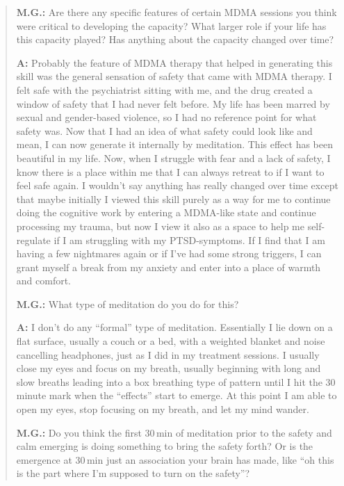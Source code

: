 \documentclass[11pt,oneside]{book}
\begin{document}
\begin{quotation}
    \vspace{\baselineskip}

    \textbf{M.G.:} Are there any specific features of certain MDMA sessions you think were critical to developing the capacity? What larger role if your life has this capacity played? Has anything about the capacity changed over time?

    \textbf{A:} Probably the feature of MDMA therapy that helped in generating this skill was the general sensation of safety that came with MDMA therapy. I felt safe with the psychiatrist sitting with me, and the drug created a window of safety that I had never felt before. My life has been marred by sexual and gender-based violence, so I had no reference point for what safety was. Now that I had an idea of what safety could look like and mean, I can now generate it internally by meditation. This effect has been beautiful in my life. Now, when I struggle with fear and a lack of safety, I know there is a place within me that I can always retreat to if I want to feel safe again. I wouldn't say anything has really changed over time except that maybe initially I viewed this skill purely as a way for me to continue doing the cognitive work by entering a MDMA-like state and continue processing my trauma, but now I view it also as a space to help me self-regulate if I am struggling with my PTSD-symptoms. If I find that I am having a few nightmares again or if I've had some strong triggers, I can grant myself a break from my anxiety and enter into a place of warmth and comfort.

    \vspace{\baselineskip}

    \textbf{M.G.:} What type of meditation do you do for this?

    \textbf{A:} I don't do any \enquote{formal} type of meditation. Essentially I lie down on a flat surface, usually a couch or a bed, with a weighted blanket and noise cancelling headphones, just as I did in my treatment sessions. I usually close my eyes and focus on my breath, usually beginning with long and slow breaths leading into a box breathing type of pattern until I hit the 30\,minute mark when the \enquote{effects} start to emerge. At this point I am able to open my eyes, stop focusing on my breath, and let my mind wander.

    \vspace{\baselineskip}

    \textbf{M.G.:} Do you think the first 30\,min of meditation prior to the safety and calm emerging is doing something to bring the safety forth? Or is the emergence at 30\,min just an association your brain has made, like \enquote{oh this is the part where I'm supposed to turn on the safety}?


\end{quotation}
\end{document}
